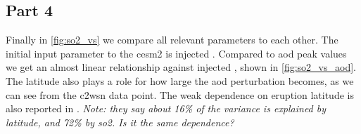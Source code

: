 \documentclass{ametsocV5}
\newcommand{\iso}[1][i]{{#1}njected \ce{SO2}}
\begin{document}


\subsection{Part 4}

Finally in \cref{fig:so2_vs} we compare all relevant parameters to each other. The
initial input parameter to the \ac{cesm2} is injected . Compared to \ac{aod}
peak values we get an almost linear relationship against \iso{}, shown in
\cref{fig:so2_vs_aod}. The latitude also plays a role for how large the \ac{aod}
perturbation becomes, as we can see from the \ac{c2wsn} data point. The weak dependence
on eruption latitude is also reported in \citet{marshall2019}. \emph{Note: they say
  about 16\% of the variance is explained by latitude, and 72\% by so2. Is it the same
  dependence?}
\end{document}
